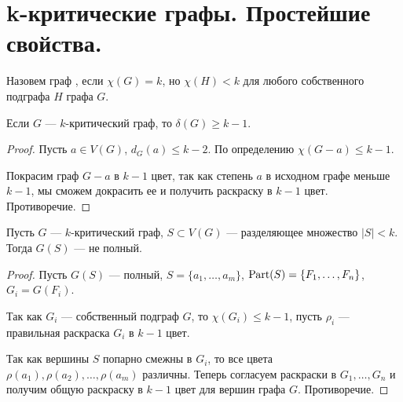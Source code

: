 \section{k-критические графы. Простейшие свойства.}
\begin{definition}
    Назовем граф , если $\chi(G) = k$, но $\chi(H) < k$ для любого собственного подграфа $H$ графа $G$.
\end{definition}
\begin{lemma}\label{lm:coloring_7}
    Если $G$ ---  $k$-критический граф, то $\delta(G) \ge k-1$.
\end{lemma}
\begin{proof}
    Пусть $a \in V(G)$, $d_G(a) \le k-2$. По определению $\chi(G-a) \le k-1$.

	Покрасим граф $G-a$ в $k-1$ цвет, так как степень $a$ в исходном графе меньше $k-1$, мы сможем докрасить ее и получить раскраску в $k-1$ цвет. Противоречие. 
\end{proof}

\begin{lemma}\label{lm:coloring_8}
    Пусть $G$ --- $k$-критический граф, $S \subset V(G)$ --- разделяющее множество $\lvert S \rvert < k$. Тогда $G(S)$ --- не полный.
\end{lemma}
\begin{proof}
    Пусть $G(S)$ --- полный, $S = \{a_1, \ldots , a_m\}$, $\operatorname{Part}(S) = \{F_1, \ldots , F_n\}$, $G_i = G(F_i)$.

	Так как $G_i$ --- собственный подграф $G$, то $\chi(G_i) \le k-1$, пусть $\rho_i$ --- правильная раскраска $G_i$ в $k-1$ цвет.

	Так как вершины $S$ попарно смежны в $G_i$, то все цвета  $\rho(a_1), \rho(a_2), \ldots , \rho(a_m)$ различны. Теперь согласуем раскраски в $G_1, \ldots , G_n$ и получим общую раскраску в $k-1$ цвет для вершин графа $G$. Противоречие. 
\end{proof}
